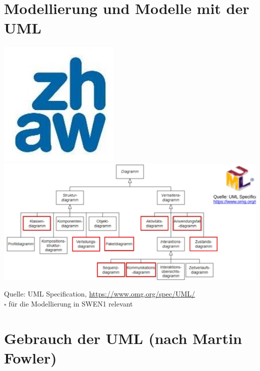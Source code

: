 \section*{Modellierung und Modelle mit der UML}
\includegraphics[width=\linewidth]{images/2025_01_02_6eafa38dd4ae10c9a392g-10}\\
\includegraphics[width=\linewidth]{images/2025_01_02_6eafa38dd4ae10c9a392g-10(1)}

Quelle: UML Specification, \href{https://www.omg.org/spec/UML/}{https://www.omg.org/spec/UML/}\\
$\square$ für die Modellierung in SWEN1 relevant

\section*{Gebrauch der UML (nach Martin Fowler)}
